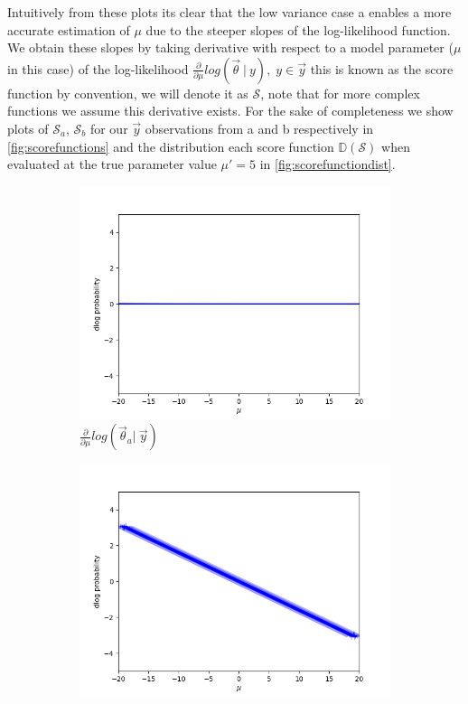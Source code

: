 \noindent Intuitively from these plots its clear that the low variance case a enables a more accurate estimation of $\mu$ due to the steeper slopes of the log-likelihood function. We obtain these slopes by taking derivative with respect to a model parameter ($\mu$ in this case) of the log-likelihood $\frac{\partial}{\partial\mu} log(\vec{\theta}\ |\ y),\;y\in\vec{y}$ this is known as the score function by convention, we will denote it as $\mathcal{S}$, note that for more complex functions we assume this derivative exists. For the sake of completeness we show plots of $\mathcal{S}_a$, $\mathcal{S}_b$ for our $\vec{y}$ observations from a and b respectively in \cref{fig:scorefunctions} and the distribution each score function $\mathbb{D}(\mathcal{S})$ when evaluated at the true parameter value $\mu' = 5$ in \cref{fig:scorefunctiondist}.
\begin{figure}
    \centering
    \begin{subfigure}{0.475\textwidth}
        \includegraphics[width=\textwidth]{figs/background/deriv_var_10.png}
        \caption[]{$\frac{\partial}{\partial\mu} log(\vec{\theta}_a |\ \vec{y})$}
    \end{subfigure}
    \begin{subfigure}{0.475\textwidth}
        \includegraphics[width=\textwidth]{figs/background/deriv_var_0.5.png}

\end{subfigure}
\end{figure}
